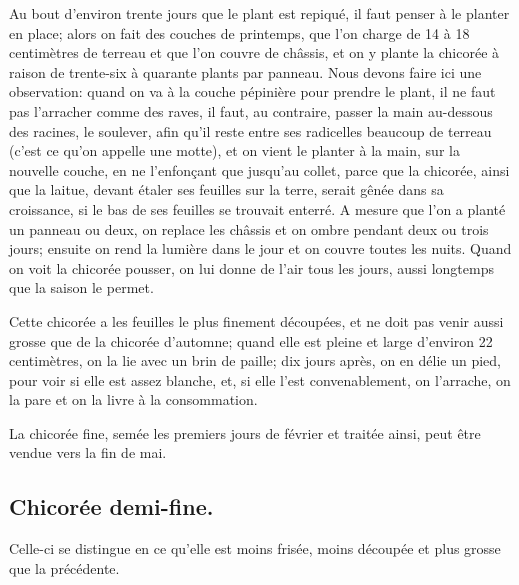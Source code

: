 \documentclass[10pt,a4paper]{book}
\begin{document}
Au bout d'environ trente jours que le plant est repiqué, il faut penser à le planter en place; alors on fait des couches de printemps, que l'on charge de 14 à 18 centimètres de terreau et que l'on couvre de châssis, et on y plante la chicorée à raison de trente-six à quarante plants par panneau. Nous devons faire ici une observation: quand on va à la couche pépinière pour prendre le plant, il ne faut pas l'arracher comme des raves, il faut, au contraire, passer la main au-dessous des racines, le soulever, afin qu'il reste entre ses radicelles beaucoup de terreau (c'est ce qu'on appelle une motte), et on vient le planter à la main, sur la nouvelle couche, en ne l'enfonçant que jusqu'au collet, parce que la chicorée, ainsi que la laitue, devant étaler ses feuilles sur la terre, serait gênée dans sa croissance, si le bas de ses feuilles se trouvait enterré. A mesure que l'on a planté un panneau ou deux, on replace les châssis et on ombre pendant deux ou trois jours; ensuite on rend la lumière dans le jour et on couvre toutes les nuits. Quand on voit la chicorée pousser, on lui donne de l'air tous les jours, aussi longtemps que la saison le permet.

Cette chicorée a les feuilles le plus finement découpées, et ne doit pas venir aussi grosse que de la chicorée d'automne; quand elle est pleine et large d'environ 22 centimètres, on la lie avec un brin de paille; dix jours après, on en délie un pied, pour voir si elle est assez blanche, et, si elle l'est convenablement, on l'arrache, on la pare et on la livre à la consommation.

La chicorée fine, semée les premiers jours de février et traitée ainsi, peut être vendue vers la fin de mai.

\subsection{Chicorée demi-fine.}

Celle-ci se distingue en ce qu'elle est moins frisée, moins découpée et plus grosse que la précédente.
\end{document}
